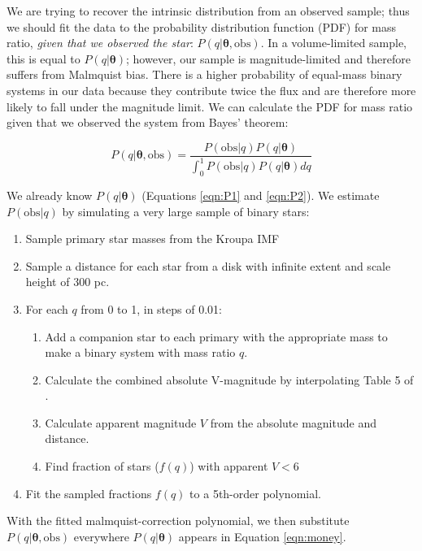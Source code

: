\documentclass{emulateapj}
\renewcommand{\vec}[1]{\bm{#1}}
\begin{document}
We are trying to recover the intrinsic distribution from an observed sample; thus we should fit the data to the probability distribution function (PDF) for mass ratio, \emph{given that we observed the star}: $P(q|\vec{\theta}, \mathrm{obs})$. In a volume-limited sample, this is equal to $P(q|\vec{\theta})$; however, our sample is magnitude-limited and therefore suffers from Malmquist bias. There is a higher probability of equal-mass binary systems in our data because they contribute twice the flux and are therefore more likely to fall under the magnitude limit. We can calculate the PDF for mass ratio given that we observed the system from Bayes' theorem:

\begin{equation}
P(q|\vec{\theta}, \mathrm{obs}) = \frac{P(\mathrm{obs}|q) P(q|\vec{\theta})}{\int_0^1 P(\mathrm{obs}|q) P(q|\vec{\theta}) dq}
\end{equation}

We already know $P(q|\vec{\theta})$ (Equations \ref{eqn:P1} and \ref{eqn:P2}). We estimate $P(\mathrm{obs}|q)$ by simulating a very large sample of binary stars:

\begin{enumerate}
\item Sample primary star masses from the Kroupa IMF \citep{Kroupa2002}
\item Sample a distance for each star from a disk with infinite extent and scale height of $300$ pc. 
\item For each $q$ from 0 to 1, in steps of 0.01:
\begin{enumerate}
  \item Add a companion star to each primary with the appropriate mass to make a binary system with mass ratio $q$.
  \item Calculate the combined absolute V-magnitude by interpolating Table 5 of \citet{Pecaut2013}.
  \item Calculate apparent magnitude $V$ from the absolute magnitude and distance.
  \item Find fraction of stars ($f(q)$) with apparent $V < 6$
\end{enumerate}
\item Fit the sampled fractions $f(q)$ to a 5th-order polynomial.
\end{enumerate}

With the fitted malmquist-correction polynomial, we then substitute $P(q|\vec{\theta}, \mathrm{obs})$ everywhere $P(q|\vec{\theta})$ appears in Equation \ref{eqn:money}.
\end{document}
